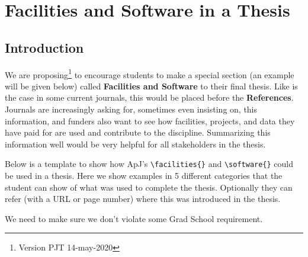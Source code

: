 \documentclass[12pt]{article}
\begin{document}
\section{Facilities and Software in a Thesis}


\subsection{Introduction}

\label{random}

We are proposing\footnote{Version PJT 14-may-2020}
to encourage students to make a special section
(an example will be given below) called {\bf Facilities and Software}
to their final thesis. Like is the case in some current journals,
this would be placed before the {\bf References}. Journals are
increasingly asking for, sometimes even insisting on, this
information, and funders also want to see how facilities, projects,
and data they have paid for are used and contribute to the
discipline. Summarizing this information well would be very helpful
for all stakeholders in the thesis.


Below is a template to show how ApJ's \verb+\facilities{}+ and
\verb+\software{}+ could be used in a thesis. Here we show examples in
5 different categories that the student can show of what was used to
complete the thesis. Optionally they can refer (with a URL or page
number) where this was introduced in the thesis.


We need to make sure we don't violate some Grad School requirement.



\end{document}
